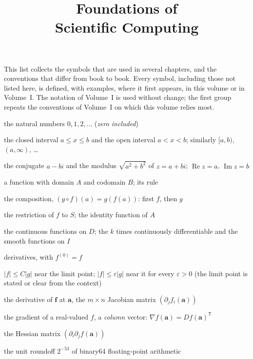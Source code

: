 \documentclass{sdbook-eng}
\title{Foundations of\\Scientific Computing}
\author{}
\date{}
\begin{document}
\frontmatter
\maketitle
\tableofcontents

\notationchapter
This list collects the symbols that are used in several chapters, and the conventions that differ from book to book. Every symbol, including those not listed here, is defined, with examples, where it first appears, in this volume or in Volume~I. The notation of Volume~I is used without change; the first group repeats the conventions of Volume~I on which this volume relies most.

\begin{symbols}
\item[$\mathbb N$] the natural numbers $0,1,2,\ldots$ (\emph{zero included})
\item[{$[a,b]$, $(a,b)$}] the closed interval $a\le x\le b$ and the open interval $a<x<b$; similarly $[a,b)$, $(a,\infty)$, \ldots
\item[$\bar z$, $|z|$] the conjugate $a-bi$ and the modulus $\sqrt{a^2+b^2}$ of $z=a+bi$; $\operatorname{Re}z=a$, $\operatorname{Im}z=b$
\item[$f\colon A\to B$, $a\mapsto f(a)$] a function with domain $A$ and codomain $B$; its rule
\item[$g\circ f$] the composition, $(g\circ f)(a)=g(f(a))$: first $f$, then $g$
\item[$f|_S$, $\operatorname{id}_A$] the restriction of $f$ to $S$; the identity function of $A$
\item[$C(D)$, $C^k(I)$, $C^\infty(I)$] the continuous functions on $D$; the $k$ times continuously differentiable and the smooth functions on $I$
\item[$f'$, $f^{(n)}$, $df/dx$] derivatives, with $f^{(0)}=f$
\item[$f=O(g)$, $f=o(g)$] $|f|\le C|g|$ near the limit point; $|f|\le\varepsilon|g|$ near it for every $\varepsilon>0$ (the limit point is stated or clear from the context)
\item[$D\mathbf f(\mathbf a)$] the derivative of $\mathbf f$ at $\mathbf a$, the $m\times n$ Jacobian matrix $(\partial_jf_i(\mathbf a))$
\item[$\nabla f(\mathbf a)$] the gradient of a real-valued $f$, a \emph{column} vector: $\nabla f(\mathbf a)=Df(\mathbf a)^{\mathsf T}$
\item[$\nabla^2f(\mathbf a)$] the Hessian matrix $(\partial_i\partial_jf(\mathbf a))$
\item[$u$] the unit roundoff $2^{-53}$ of binary64 floating-point arithmetic
\end{symbols}
\end{document}
